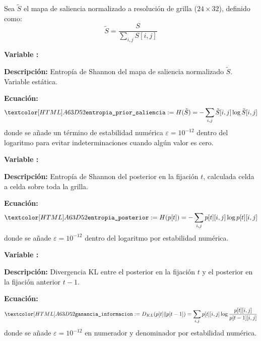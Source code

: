 Sea $\tilde{S}$ el mapa de saliencia normalizado a resolución de
grilla ($24 \times 32$), definido como:
\begin{equation}
    \tilde{S} = \frac{S}{\sum_{i,j} S[i,j]}
\end{equation}

\begin{featuredef}
\textbf{Variable \thetcbcounter:} 

\textbf{Descripción:} Entropía de Shannon del mapa de saliencia
normalizado $\tilde{S}$. Variable estática.

\textbf{Ecuación:}
\begin{equation}
    \feat{entropia\_prior\_saliencia} := H(\tilde{S}) =
    -\sum_{i,j} \tilde{S}[i,j] \log \tilde{S}[i,j]
\end{equation}
donde se añade un término de estabilidad numérica
$\varepsilon = 10^{-12}$ dentro del logaritmo para evitar
indeterminaciones cuando algún valor es cero.
\end{featuredef}



\begin{featuredef}
\textbf{Variable \thetcbcounter:} 

\textbf{Descripción:} Entropía de Shannon del posterior en la fijación
$t$, calculada celda a celda sobre toda la grilla.

\textbf{Ecuación:}
\begin{equation}
    \feat{entropia\_posterior} := H(p[t]) =
    -\sum_{i,j} p[t][i,j] \log p[t][i,j]
\end{equation}
donde se añade $\varepsilon = 10^{-12}$ dentro del logaritmo por
estabilidad numérica.
\end{featuredef}

\begin{featuredef}
\textbf{Variable \thetcbcounter:} 

\textbf{Descripción:} Divergencia KL entre el posterior en la fijación
$t$ y el posterior en la fijación anterior $t-1$.

\textbf{Ecuación:}
\begin{equation}
    \feat{ganancia\_informacion} := D_{KL}(p[t] \| p[t-1]) =
    \sum_{i,j} p[t][i,j] \log \frac{p[t][i,j]}{p[t-1][i,j]}
\end{equation}
donde se añade $\varepsilon = 10^{-12}$ en numerador y denominador
por estabilidad numérica.
\end{featuredef}

